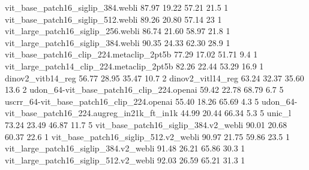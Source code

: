 {vit_base_patch16_siglip_384.webli	87.97	19.22	57.21	21.5	1
vit_base_patch16_siglip_512.webli	89.26	20.80	57.14	23	1
vit_large_patch16_siglip_256.webli	86.74	21.60	58.97	21.8	1
vit_large_patch16_siglip_384.webli	90.35	24.33	62.30	28.9	1
vit_base_patch16_clip_224.metaclip_2pt5b	77.29	17.02	51.71	9.4	1
vit_large_patch14_clip_224.metaclip_2pt5b	82.26	22.44	53.29	16.9	1
dinov2_vitb14_reg	56.77	28.95	35.47	10.7	2
dinov2_vitl14_reg	63.24	32.37	35.60	13.6	2
udon_64-vit_base_patch16_clip_224.openai	59.42	22.78	68.79	6.7	5
uscrr_64-vit_base_patch16_clip_224.openai	55.40	18.26	65.69	4.3	5
udon_64-vit_base_patch16_224.augreg_in21k_ft_in1k	44.99	20.44	66.34	5.3	5
unic_l	73.24	23.49	46.87	11.7	5
vit_base_patch16_siglip_384.v2_webli	90.01		20.68		60.37			22.6	1
vit_base_patch16_siglip_512.v2_webli	90.97		21.75		59.86			23.5	1
vit_large_patch16_siglip_384.v2_webli	91.48		26.21		65.86			30.3	1
vit_large_patch16_siglip_512.v2_webli	92.03		26.59		65.21			31.3	1
}{\instregldsop}